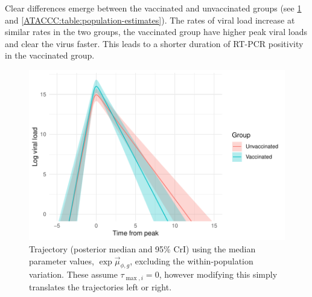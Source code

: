 \documentclass[thesis.tex]{subfiles}
\begin{document}
Clear differences emerge between the vaccinated and unvaccinated groups (see \cref{ATACCC:fig:median-trajectories} and \cref{ATACCC:table:population-estimates}).
The rates of viral load increase at similar rates in the two groups, the vaccinated group have higher peak viral loads and clear the virus faster.
This leads to a shorter duration of RT-PCR positivity in the vaccinated group.
\begin{figure}
  \centering \includegraphics{ATACCC/mean_trajectories}
  \caption[Median viral load trajectories]{Trajectory (posterior median and 95\% CrI) using the median parameter values, $\exp \vec{\mu}_{\phi,g}$, excluding the within-population variation. These assume $\tau_{\max,i}=0$, however modifying this simply translates the trajectories left or right. \label{ATACCC:fig:median-trajectories}}
\end{figure}
\begin{table}
  \caption{Population-level estimates of the viral load parameters (posterior medians and 95\% CrI). The vaccinated population have higher peak viral loads but clear the virus faster. \label{ATACCC:table:population-estimates}}
\end{table}
\end{document}
